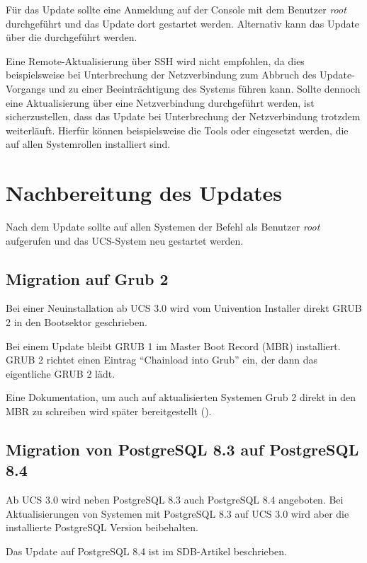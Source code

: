 Für das Update sollte eine Anmeldung auf der Console mit dem
Benutzer \emph{root} durchgeführt und das Update dort gestartet werden.
Alternativ kann das Update über die \ucsUMC{} durchgeführt werden.

Eine Remote-Aktualisierung über SSH wird nicht empfohlen, da dies
beispielsweise bei Unterbrechung der Netzverbindung zum Abbruch des
Update-Vorgangs und zu einer Beeinträchtigung des Systems führen kann. Sollte
dennoch eine Aktualisierung über eine Netzverbindung durchgeführt werden, ist
sicherzustellen, dass das Update bei Unterbrechung der Netzverbindung trotzdem
weiterläuft. Hierfür können beispielsweise die Tools  oder
 eingesetzt werden, die auf allen Systemrollen installiert sind.




\chapter{Nachbereitung des Updates}

Nach dem Update sollte auf allen Systemen der
Befehl  als
Benutzer \emph{root} aufgerufen und das UCS-System neu gestartet werden.

\section{Migration auf Grub 2}

Bei einer Neuinstallation ab UCS 3.0 wird vom Univention Installer direkt GRUB 2 in den
Bootsektor geschrieben.

Bei einem Update bleibt GRUB 1 im Master Boot Record (MBR) installiert. GRUB 2
richtet einen Eintrag ``Chainload into Grub'' ein, der dann das eigentliche
GRUB 2 lädt.

Eine Dokumentation, um auch auf aktualisierten Systemen Grub 2 direkt
in den MBR zu schreiben wird später bereitgestellt ().

\section{Migration von PostgreSQL 8.3 auf PostgreSQL 8.4}
Ab UCS 3.0 wird neben PostgreSQL 8.3 auch PostgreSQL 8.4
angeboten. Bei Aktualisierungen von Systemen mit PostgreSQL 8.3 auf
UCS 3.0 wird aber die installierte PostgreSQL Version beibehalten.

Das Update auf PostgreSQL 8.4 ist im
SDB-Artikel  beschrieben.

